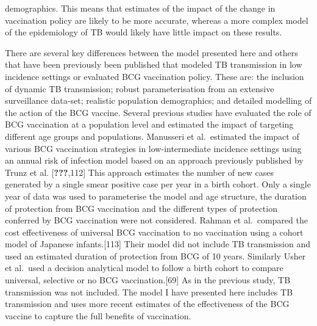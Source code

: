\documentclass[11pt,twoside]{bristolthesis}
\begin{document}
demographics. This means that estimates of the impact of the change in vaccination policy are likely to be more accurate, whereas a more complex model of the epidemiology of TB would likely have little impact on these results.
  
  There are several key differences between the model presented here and others that have been previously been published that modeled TB transmission in low incidence settings or evaluated BCG vaccination policy. These are: the inclusion of dynamic TB transmission; robust parameterisation from an extensive surveillance data-set; realistic population demographics; and detailed modelling of the action of the BCG vaccine. Several previous studies have evaluated the role of BCG vaccination at a population level and estimated the impact of targeting different age groups and populations. Manusseri et al.~estimated the impact of various BCG vaccination strategies in low-intermediate incidence settings using an annual risk of infection model based on an approach previously published by Trunz et al. {[}{\textbf{???}},112{]} This approach estimates the number of new cases generated by a single smear positive case per year in a birth cohort. Only a single year of data was used to parameterise the model and age structure, the duration of protection from BCG vaccination and the different types of protection conferred by BCG vaccination were not considered. Rahman et al.~compared the cost effectiveness of universal BCG vaccination to no vaccination using a cohort model of Japanese infants.{[}113{]} Their model did not include TB transmission and used an estimated duration of protection from BCG of 10 years. Similarly Usher et al.~used a decision analytical model to follow a birth cohort to compare universal, selective or no BCG vaccination.{[}69{]} As in the previous study, TB transmission was not included. The model I have presented here includes TB transmission and uses more recent estimates of the effectiveness of the BCG vaccine to capture the full benefits of vaccination.
  
\end{document}
